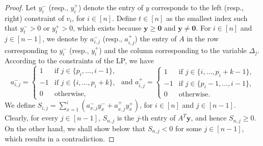 \documentclass[english]{lipics-v2021}
\begin{document}
\begin{proof}
Let $y_i^-$ (resp., $y_i^+$) denote the entry of $y$ corresponds to the left (resp., right) constraint of $v_i$, for $i \in [n]$.
Define $t \in [n]$ as the smallest index such that $y_t^- > 0$ or $y_t^+ > 0$, which exists because $\mathbf{y} \geq \mathbf{0}$ and $\mathbf{y} \neq \mathbf{0}$.
For $i \in [n]$ and $j \in [n-1]$, we denote by $a_{i,j}^-$ (resp., $a_{i,j}^+$) the entry of $A$ in the row corresponding to $y_i^-$ (resp., $y_i^+$) and the column corresponding to the variable $\Delta_j$.
According to the constraints of the LP, we have
\begin{equation*}
    a_{i,j}^- = \left\{
    \begin{array}{ll}
        1 & \text{if } j \in \{p_i,\dots,i-1\}, \\
        -1 & \text{if } j \in \{i,\dots,p_i+k\}, \\
        0 & \text{otherwise},
    \end{array}
    \right.
    \text{ and \ }
    a_{i,j}^+ = \left\{
    \begin{array}{ll}
        1 & \text{if } j \in \{i,\dots,p_i+k-1\}, \\
        -1 & \text{if } j \in \{p_i-1,\dots,i-1\}, \\
        0 & \text{otherwise}.
    \end{array}
    \right.
\end{equation*}
We define $S_{i,j} = \sum_{x=1}^i (a_{x,j}^- y_x^- + a_{x,j}^+ y_x^+)$, for $i \in [n]$ and $j \in [n-1]$.
Clearly, for every $j \in [n-1]$, $S_{n,j}$ is the $j$-th entry of $A^T \mathbf{y}$, and hence $S_{n,j} \geq 0$.
On the other hand, we shall show below that $S_{n,j} < 0$ for some $j \in [n-1]$, which results in a contradiction.


\end{proof}
\end{document}
